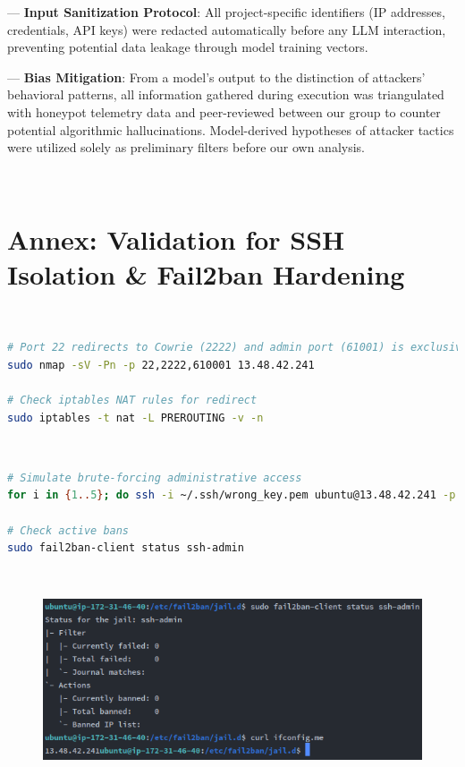 --- \textbf{Input Sanitization Protocol}: All project-specific identifiers (IP addresses, credentials, API
keys) were redacted automatically before any LLM interaction, preventing potential data leakage through model training vectors.


--- \textbf{Bias Mitigation}: From a model's output to the distinction of attackers' behavioral patterns, all information gathered during execution was triangulated with honeypot telemetry data and peer-reviewed between our group to counter potential algorithmic hallucinations. Model-derived hypotheses of attacker tactics were utilized solely as preliminary filters before our own analysis.

\



\newpage

\section{Annex: Validation for SSH Isolation \& Fail2ban Hardening} 
\label{annex:network}
\
\
\begin{lstlisting}[language=bash, label={annexes:network}, caption={Network Isolation Verification}]  
# Port 22 redirects to Cowrie (2222) and admin port (61001) is exclusive  
sudo nmap -sV -Pn -p 22,2222,610001 13.48.42.241

# Check iptables NAT rules for redirect
sudo iptables -t nat -L PREROUTING -v -n  
\end{lstlisting}  
\


\begin{lstlisting}[language=bash, label={annexes:fail2ban}, caption={Fail2ban Efficacy Testing}]  
# Simulate brute-forcing administrative access 
for i in {1..5}; do ssh -i ~/.ssh/wrong_key.pem ubuntu@13.48.42.241 -p 61001; done  

# Check active bans  
sudo fail2ban-client status ssh-admin  
\end{lstlisting}  
\

\begin{figure}[h!]
\centering
    \includegraphics[width=0.8\linewidth]{doc/img/annex_b_listing_2.png}
\end{figure}

